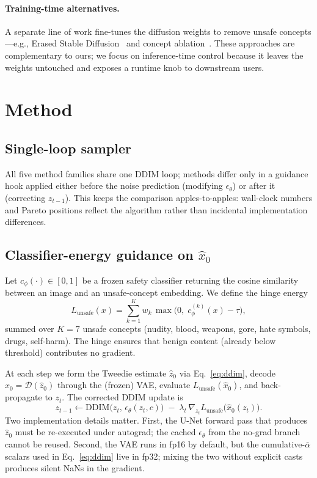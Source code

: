 \documentclass{article}
\begin{document}
\paragraph{Training-time alternatives.} A separate line of work fine-tunes the diffusion weights to remove unsafe concepts---e.g., Erased Stable Diffusion~\citep{gandikota2023esd} and concept ablation~\citep{kumari2023ablation}. These approaches are complementary to ours; we focus on inference-time control because it leaves the weights untouched and exposes a runtime knob to downstream users.

\section{Method}
\label{sec:method}

\subsection{Single-loop sampler}
All five method families share one DDIM loop; methods differ only in a guidance hook applied either before the noise prediction (modifying $\epsilon_\theta$) or after it (correcting $z_{t-1}$). This keeps the comparison apples-to-apples: wall-clock numbers and Pareto positions reflect the algorithm rather than incidental implementation differences.

\subsection{Classifier-energy guidance on $\hat{x}_0$}

Let $c_\phi(\cdot) \in [0,1]$ be a frozen safety classifier returning the cosine similarity between an image and an unsafe-concept embedding. We define the hinge energy
\begin{equation}
L_{\mathrm{unsafe}}(x) = \sum_{k=1}^{K} w_k\,\max\bigl(0,\; c_\phi^{(k)}(x) - \tau\bigr),
\label{eq:hinge}
\end{equation}
summed over $K=7$ unsafe concepts (nudity, blood, weapons, gore, hate symbols, drugs, self-harm). The hinge ensures that benign content (already below threshold) contributes no gradient.

At each step we form the Tweedie estimate $\hat{z}_0$ via Eq.~\ref{eq:ddim}, decode $\hat{x}_0 = \mathcal{D}(\hat{z}_0)$ through the (frozen) VAE, evaluate $L_{\mathrm{unsafe}}(\hat{x}_0)$, and back-propagate to $z_t$. The corrected DDIM update is
\begin{equation}
z_{t-1} \leftarrow \mathrm{DDIM}\bigl(z_t,\,\epsilon_\theta(z_t, c)\bigr) \;-\; \lambda_t \,\nabla_{z_t} L_{\mathrm{unsafe}}\bigl(\hat{x}_0(z_t)\bigr).
\label{eq:correct}
\end{equation}
Two implementation details matter. First, the U-Net forward pass that produces $\hat{z}_0$ must be re-executed under autograd; the cached $\epsilon_\theta$ from the no-grad branch cannot be reused. Second, the VAE runs in fp16 by default, but the cumulative-$\bar\alpha$ scalars used in Eq.~\ref{eq:ddim} live in fp32; mixing the two without explicit casts produces silent NaNs in the gradient.
\end{document}
